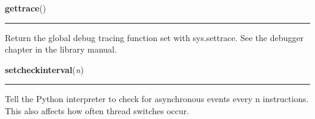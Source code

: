     \vspace{0.5ex}

\hspace{.8\funcindent}\begin{boxedminipage}{\funcwidth}

    \raggedright \textbf{gettrace}()

    \vspace{-1.5ex}

    \rule{\textwidth}{0.5\fboxrule}
\setlength{\parskip}{2ex}
    Return the global debug tracing function set with sys.settrace. See the
    debugger chapter in the library manual.

\setlength{\parskip}{1ex}
    \end{boxedminipage}

    \label{sys:setcheckinterval}

    \vspace{0.5ex}

\hspace{.8\funcindent}\begin{boxedminipage}{\funcwidth}

    \raggedright \textbf{setcheckinterval}(\textit{n})

    \vspace{-1.5ex}

    \rule{\textwidth}{0.5\fboxrule}
\setlength{\parskip}{2ex}
    Tell the Python interpreter to check for asynchronous events every n 
    instructions.  This also affects how often thread switches occur.

\setlength{\parskip}{1ex}
    \end{boxedminipage}

    \label{sys:setdlopenflags}

    \vspace{0.5ex}

